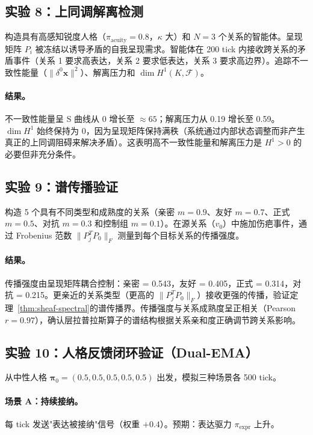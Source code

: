 \documentclass[11pt]{article}
\begin{document}
\subsection{实验 8：上同调解离检测}

构造具有高感知锐度人格（$\pi_{\text{acuity}} = 0.8$，$\kappa$ 大）和 $N=3$ 个关系的智能体。呈现矩阵 $P_i$ 被冻结以诱导矛盾的自我呈现需求。智能体在 200 tick 内接收跨关系的矛盾事件（关系 1 要求高表达，关系 2 要求低表达，关系 3 要求高边界）。追踪不一致性能量（$\|\delta^0 \mathbf{x}\|^2$）、解离压力和 $\dim H^1(K, \mathcal{F})$。

\paragraph{结果。}不一致性能量呈 S 曲线从 0 增长至 $\approx 65$；解离压力从 0.19 增长至 0.59。$\dim H^1$ 始终保持为 0，因为呈现矩阵保持满秩（系统通过内部状态调整而非产生真正的上同调阻碍来解决矛盾）。这表明高不一致性能量和解离压力是 $H^1 > 0$ 的必要但非充分条件。

\subsection{实验 9：谱传播验证}

构造 5 个具有不同类型和成熟度的关系（亲密 $m=0.9$、友好 $m=0.7$、正式 $m=0.5$、对抗 $m=0.3$ 和控制组 $m=0.1$）。在源关系（$v_0$）中施加伤疤事件，通过 Frobenius 范数 $\|P_j^T P_0\|_F$ 测量到每个目标关系的传播强度。

\paragraph{结果。}传播强度由呈现矩阵耦合控制：亲密 = 0.543，友好 = 0.405，正式 = 0.314，对抗 = 0.215。更亲近的关系类型（更高的 $\|P_j^T P_0\|_F$）接收更强的传播，验证定理~\ref{thm:sheaf-spectral}的谱传播界。传播强度与关系成熟度呈正相关（Pearson $r = 0.97$），确认层拉普拉斯算子的谱结构根据关系亲和度正确调节跨关系影响。

\subsection{实验 10：人格反馈闭环验证（Dual-EMA）}

从中性人格 $\boldsymbol{\pi}_0 = (0.5, 0.5, 0.5, 0.5, 0.5)$ 出发，模拟三种场景各 500 tick。

\paragraph{场景 A：持续接纳。}每 tick 发送"表达被接纳"信号（权重 $+0.4$）。预期：表达驱力 $\pi_{\text{expr}}$ 上升。
\end{document}
